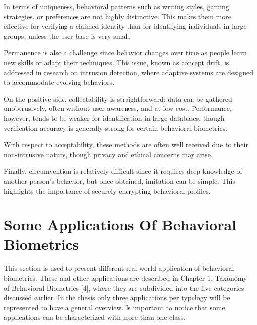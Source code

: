 \documentclass[12pt]{report}
\begin{document}
In terms of uniqueness, behavioral patterns such as writing styles, gaming strategies, or preferences are not highly distinctive.
This makes them more effective for verifying a claimed identity than for identifying individuals in large groups, unless the user base is very small.

Permanence is also a challenge since behavior changes over time as people learn new skills or adapt their techniques.
This issue, known as concept drift, is addressed in research on intrusion detection, where adaptive systems are designed to accommodate evolving behaviors.

On the positive side, collectability is straightforward: data can be gathered unobtrusively, often without user awareness, and at low cost. 
Performance, however, tends to be weaker for identification in large databases, though verification accuracy is generally strong for certain behavioral biometrics.

With respect to acceptability, these methods are often well received due to their non-intrusive nature, though privacy and ethical concerns may arise. 

Finally, circumvention is relatively difficult since it requires deep knowledge of another person's behavior, but once obtained, imitation can be simple.
This highlights the importance of securely encrypting behavioral profiles.

\section{Some Applications Of Behavioral Biometrics}

This section is used to present different real world application of behavioral biometrics.
These and other applications are described in Chapter 1, Taxonomy of Behavioral Biometrics [4], where they are subdivided into the five categories discussed earlier.
In the thesis only three applications per typology will be represented to have a general overview. 
Is important to notice that some applications can be characterized with more than one class.
\end{document}
